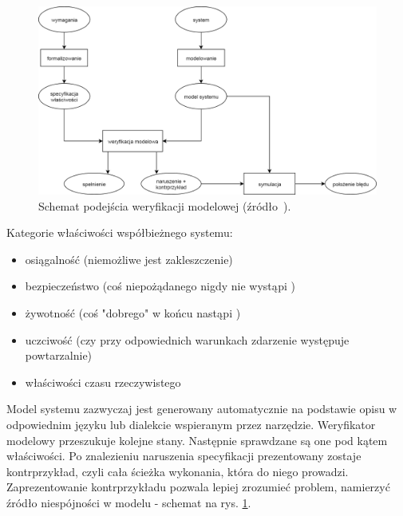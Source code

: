 \vspace{0.5cm}
\begin{figure}[h]
    \centering
    \includegraphics[width=\textwidth,keepaspectratio]{img/model_checking_approach_schematic_view.png}
    \caption{Schemat podejścia weryfikacji modelowej (źródło~\cite{Bai08}).}
    \label{fig:model_checking_scheme}
\end{figure}

\noindent
Kategorie właściwości współbieżnego systemu:
\begin{itemize}
\item osiągalność (niemożliwe jest zakleszczenie)
\item bezpieczeństwo (coś niepożądanego nigdy nie wystąpi \cite{Alp87})
\item żywotność (coś "dobrego" w końcu nastąpi \cite{Alp85})
\item uczciwość (czy przy odpowiednich warunkach zdarzenie występuje powtarzalnie)
\item właściwości czasu rzeczywistego
\end{itemize}

\vspace{0.5cm}
Model systemu zazwyczaj jest generowany automatycznie na podstawie opisu w odpowiednim języku lub dialekcie wspieranym przez narzędzie. 
Weryfikator modelowy przeszukuje kolejne stany.
Następnie sprawdzane są one pod kątem właściwości.
Po znalezieniu naruszenia specyfikacji prezentowany zostaje kontrprzykład, czyli cała ścieżka wykonania, która do niego prowadzi.
Zaprezentowanie kontrprzykładu pozwala lepiej zrozumieć problem, namierzyć źródło niespójności w modelu - schemat na rys. \ref{fig:model_checking_scheme}.

